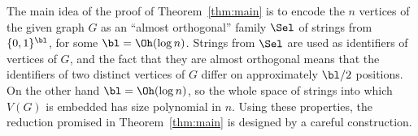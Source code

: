 The main idea of the proof of Theorem~\ref{thm:main} is to encode the $n$ vertices of the given graph $G$ as an ``almost orthogonal'' family $\Sel$ of strings from $\{0,1\}^\bl$, for some $\bl=\Oh(\log n)$. Strings from $\Sel$ are used as identifiers of vertices of $G$, and the fact that they are almost orthogonal means that the identifiers of two distinct vertices of $G$ differ on approximately $\bl/2$ positions. On the other hand $\bl=\Oh(\log n)$, so the whole space of strings into which $V(G)$ is embedded has size polynomial in $n$. Using these properties, the reduction promised in Theorem~\ref{thm:main} is designed by a careful construction.


